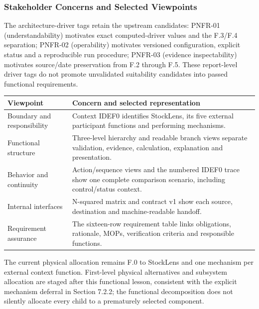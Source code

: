 \documentclass[11pt,letterpaper]{article}
\begin{document}
\subsubsection{Stakeholder Concerns and Selected Viewpoints}
The architecture-driver tags retain the upstream candidates: PNFR-01 (understandability) motivates exact computed-driver values and the F.3/F.4 separation; PNFR-02 (operability) motivates versioned configuration, explicit status and a reproducible run procedure; PNFR-03 (evidence inspectability) motivates source/date preservation from F.2 through F.5. These report-level driver tags do not promote unvalidated suitability candidates into passed functional requirements.
\begin{tabularx}{\linewidth}{@{}p{.23\linewidth}X@{}}\toprule
Viewpoint & Concern and selected representation\\\midrule
Boundary and responsibility & Context IDEF0 identifies StockLens, its five external participant functions and performing mechanisms.\\
Functional structure & Three-level hierarchy and readable branch views separate validation, evidence, calculation, explanation and presentation.\\
Behavior and continuity & Action/sequence views and the numbered IDEF0 trace show one complete comparison scenario, including control/status context.\\
Internal interfaces & N-squared matrix and contract v1 show each source, destination and machine-readable handoff.\\
Requirement assurance & The sixteen-row requirement table links obligations, rationale, MOPs, verification criteria and responsible functions.\\\bottomrule\end{tabularx}

The current physical allocation remains F.0 to StockLens and one mechanism per external context function. First-level physical alternatives and subsystem allocation are staged after this functional lesson, consistent with the explicit mechanism deferral in Section 7.2.2; the functional decomposition does not silently allocate every child to a prematurely selected component.
\end{document}
